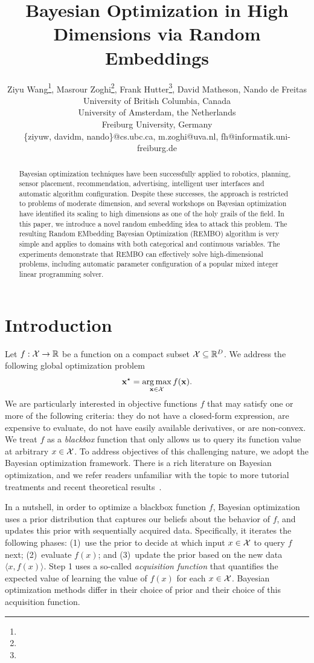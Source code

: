 \documentclass{article}
\title{Bayesian Optimization in High Dimensions via Random Embeddings}
\author{Ziyu Wang\footnote{},
Masrour Zoghi\footnote{},
Frank Hutter\footnote{},
David Matheson\samethanks[1],
Nando de Freitas\samethanks[1]\\
\samethanks[1]University of British Columbia, Canada \\
\samethanks[2]University of Amsterdam, the Netherlands\\
\samethanks[3]Freiburg University, Germany\\
\samethanks[1]\{ziyuw, davidm, nando\}@cs.ubc.ca, \samethanks[2]m.zoghi@uva.nl, \samethanks[3]fh@informatik.uni-freiburg.de}
\DeclareMathOperator*{\argmax}{arg\,max}
\begin{document}
\maketitle

\begin{abstract}
  Bayesian optimization techniques have been successfully applied to robotics, planning, sensor placement, recommendation, advertising, intelligent user interfaces and automatic algorithm configuration. Despite these successes, the approach is restricted to problems of moderate dimension, and several 
workshops on Bayesian optimization have identified its scaling to high dimensions as one of the holy grails of the field. 
In this paper, we introduce a novel random embedding idea to attack this problem.
The resulting Random EMbedding Bayesian Optimization (REMBO) algorithm is very simple
and applies to domains with both categorical and continuous variables. 
The experiments demonstrate that REMBO can effectively solve high-dimensional problems, including automatic parameter configuration of a popular
mixed integer linear programming solver.

\end{abstract}




\section{Introduction}
\label{sec:introduction}
Let $f: {\cal X} \to \mathbb{R}$ be a function on a compact subset ${\cal X} \subseteq \mathbb{R}^D$. We address the following global optimization problem
\[ \vx^{\star} = \argmax_{\vx \in {\cal X}} f(\vx). \]
We are particularly interested in objective functions $f$ that may satisfy one or more of the following criteria: they do not have a closed-form expression, are expensive to evaluate, do not have easily available derivatives, or are non-convex. We treat $f$ as a \emph{blackbox} function that only allows us to query its function value at arbitrary $x\in \cal{X}$.
To address objectives of this challenging nature, we adopt the Bayesian optimization framework. 
There is a rich literature on Bayesian optimization, and we refer readers unfamiliar with the topic to more tutorial treatments \cite{Brochu:2009,Jones:1998,Jones:2001,Lizotte:2011,Mockus:1994,Osborne:2009} and recent theoretical results~\cite{Srinivas:2010,deFreitas:2012}. 

In a nutshell, in order to optimize a blackbox function $f$, Bayesian optimization uses a prior distribution that captures our beliefs about the behavior of $f$,
and updates this prior with sequentially acquired data.
Specifically, it iterates the following phases:
(1)~use the prior to decide at which input $x\in \cal X$ to query $f$ next; 
(2)~evaluate $f(x)$; and (3)~update the prior based on the new data $\langle{}x, f(x)\rangle$.
Step 1 uses a so-called \emph{acquisition function} that quantifies the expected value of learning the value of $f(x)$ for each $x \in \cal X$.
Bayesian optimization methods differ in their choice of prior and their choice of this acquisition function.
\end{document}
